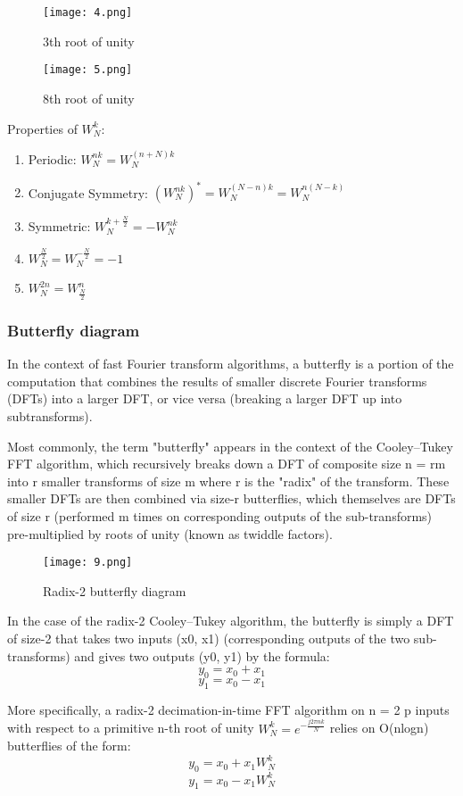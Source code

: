 \documentclass[12pt,a4paper]{article}
\begin{document}
\begin{center}
\begin{figure}[hbtp]
\centering
\texttt{[image: 4.png]}
\caption{3th root of unity}
\end{figure}
\end{center}
\begin{figure}[hbtp]
\centering
\texttt{[image: 5.png]}
\caption{8th root of unity}
\end{figure}
\newpage
Properties of $W_N^k$:
\begin{enumerate}
\item Periodic: $W_N^{nk}=W_N^{(n+N)k}$
\item Conjugate Symmetry: $(W_N^{nk})^*=W_N^{(N-n)k}=W_N^{n(N-k)}$
\item Symmetric: $W_N^{k+\frac{N}{2}}=-W_N^{nk}$
\item $W_N^{\frac{N}{2}}=W_N^{-\frac{N}{2}}=-1$
\item $W_N^{2n}=W_{\frac{N}{2}}^{n}$
\end{enumerate}

\subsubsection{Butterfly diagram}
In the context of fast Fourier transform algorithms, a butterfly is a portion of the computation that combines the results of smaller discrete Fourier transforms (DFTs) into a larger DFT, or vice versa (breaking a larger DFT up into subtransforms). 


Most commonly, the term "butterfly" appears in the context of the Cooley–Tukey FFT algorithm, which recursively breaks down a DFT of composite size n = rm into r smaller transforms of size m where r is the "radix" of the transform. These smaller DFTs are then combined via size-r butterflies, which themselves are DFTs of size r (performed m times on corresponding outputs of the sub-transforms) pre-multiplied by roots of unity (known as twiddle factors). 
\begin{figure}[hbtp]
\centering
\texttt{[image: 9.png]}
\caption{Radix-2 butterfly diagram}
\end{figure}

In the case of the radix-2 Cooley–Tukey algorithm, the butterfly is simply a DFT of size-2 that takes two inputs (x0, x1) (corresponding outputs of the two sub-transforms) and gives two outputs (y0, y1) by the formula:
$$y_0=x_0+x_1$$
$$y_1=x_0-x_1$$

More specifically, a radix-2 decimation-in-time FFT algorithm on n = 2 p inputs with respect to a primitive n-th root of unity $W _{N}^{k}=e^{-{\frac {j2\pi n
k}{N}}}$ relies on O(nlogn) butterflies of the form:
$$y_0=x_0+x_1 W _{N}^{k}$$
$$y_1=x_0-x_1 W _{N}^{k}$$
\end{document}
